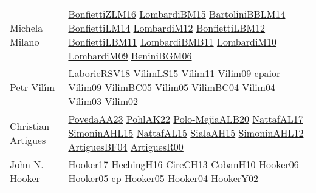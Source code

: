 {\begin{longtable}{p{4cm}p{20cm}}
Michela Milano & \href{papers/BonfiettiZLM16.pdf}{BonfiettiZLM16}\cite{BonfiettiZLM16} \href{papers/LombardiBM15.pdf}{LombardiBM15}\cite{LombardiBM15} \href{papers/BartoliniBBLM14.pdf}{BartoliniBBLM14}\cite{BartoliniBBLM14} \href{papers/BonfiettiLM14.pdf}{BonfiettiLM14}\cite{BonfiettiLM14} \href{articles/LombardiM12.pdf}{LombardiM12}\cite{LombardiM12} \href{papers/BonfiettiLBM12.pdf}{BonfiettiLBM12}\cite{BonfiettiLBM12} \href{papers/BonfiettiLBM11.pdf}{BonfiettiLBM11}\cite{BonfiettiLBM11} \href{papers/LombardiBMB11.pdf}{LombardiBMB11}\cite{LombardiBMB11} \href{papers/LombardiM10.pdf}{LombardiM10}\cite{LombardiM10} \href{papers/LombardiM09.pdf}{LombardiM09}\cite{LombardiM09} \href{papers/BeniniBGM06.pdf}{BeniniBGM06}\cite{BeniniBGM06} \\
Petr Vil{\'{\i}}m & \href{articles/LaborieRSV18.pdf}{LaborieRSV18}\cite{LaborieRSV18} \href{papers/VilimLS15.pdf}{VilimLS15}\cite{VilimLS15} \href{papers/Vilim11.pdf}{Vilim11}\cite{Vilim11} \href{papers/Vilim09.pdf}{Vilim09}\cite{Vilim09} \href{papers/cpaior-Vilim09.pdf}{cpaior-Vilim09}\cite{cpaior-Vilim09} \href{articles/VilimBC05.pdf}{VilimBC05}\cite{VilimBC05} \href{papers/Vilim05.pdf}{Vilim05}\cite{Vilim05} \href{papers/VilimBC04.pdf}{VilimBC04}\cite{VilimBC04} \href{papers/Vilim04.pdf}{Vilim04}\cite{Vilim04} \href{papers/Vilim03.pdf}{Vilim03}\cite{Vilim03} \href{papers/Vilim02.pdf}{Vilim02}\cite{Vilim02} \\
Christian Artigues & \href{papers/PovedaAA23.pdf}{PovedaAA23}\cite{PovedaAA23} \href{articles/PohlAK22.pdf}{PohlAK22}\cite{PohlAK22} \href{articles/Polo-MejiaALB20.pdf}{Polo-MejiaALB20}\cite{Polo-MejiaALB20} \href{articles/NattafAL17.pdf}{NattafAL17}\cite{NattafAL17} \href{articles/SimoninAHL15.pdf}{SimoninAHL15}\cite{SimoninAHL15} \href{articles/NattafAL15.pdf}{NattafAL15}\cite{NattafAL15} \href{papers/SialaAH15.pdf}{SialaAH15}\cite{SialaAH15} \href{papers/SimoninAHL12.pdf}{SimoninAHL12}\cite{SimoninAHL12} \href{papers/ArtiguesBF04.pdf}{ArtiguesBF04}\cite{ArtiguesBF04} \href{articles/ArtiguesR00.pdf}{ArtiguesR00}\cite{ArtiguesR00} \\
John N. Hooker & \href{papers/Hooker17.pdf}{Hooker17}\cite{Hooker17} \href{papers/HechingH16.pdf}{HechingH16}\cite{HechingH16} \href{papers/CireCH13.pdf}{CireCH13}\cite{CireCH13} \href{papers/CobanH10.pdf}{CobanH10}\cite{CobanH10} \href{articles/Hooker06.pdf}{Hooker06}\cite{Hooker06} \href{articles/Hooker05.pdf}{Hooker05}\cite{Hooker05} \href{papers/cp-Hooker05.pdf}{cp-Hooker05}\cite{cp-Hooker05} \href{papers/Hooker04.pdf}{Hooker04}\cite{Hooker04} \href{papers/HookerY02.pdf}{HookerY02}\cite{HookerY02} \\

\end{longtable}}
